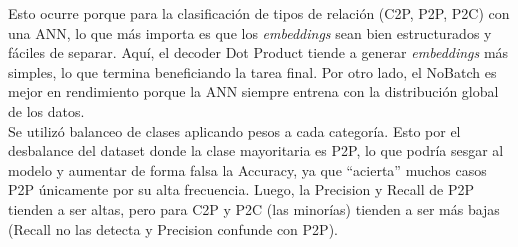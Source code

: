 Esto ocurre porque para la clasificación de tipos de relación (C2P, P2P, P2C) con una ANN, lo que más importa es que los \textit{embeddings} sean bien estructurados y fáciles de separar. Aquí, el decoder Dot Product tiende a generar \textit{embeddings} más simples, lo que termina beneficiando la tarea final. Por otro lado, el NoBatch es mejor en rendimiento porque la ANN siempre entrena con la distribución global de los datos.\\


Se utilizó balanceo de clases aplicando pesos a cada categoría. Esto por el desbalance del dataset donde la clase mayoritaria es P2P, lo que podría sesgar al modelo y aumentar de forma falsa la Accuracy, ya que “acierta” muchos casos P2P únicamente por su alta frecuencia. Luego, la Precision y Recall de P2P tienden a ser altas, pero para C2P y P2C (las minorías) tienden a ser más bajas (Recall no las detecta y Precision confunde con P2P).







